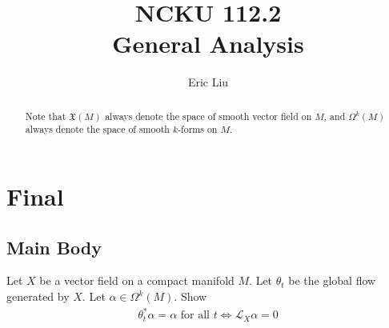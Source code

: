 \documentclass{report}
\title{\Huge{NCKU 112.2}\\
General Analysis}
\author{\huge{Eric Liu}}
\date{}
\begin{document}
\newpage%

\pagebreak
\chapter{Final} 
\section{Main Body}
\begin{abstract}
  Note that $\mathfrak{X}(M)$ always denote the space of smooth vector field on $M$, and $\Omega^k(M)$ always denote the space of smooth $k$-forms on  $M$. 
\end{abstract}
\begin{question}{}{}
Let $X$ be a vector field on a compact manifold $M$. Let  $\theta_t$ be the global flow generated by $X$. Let  $\alpha \in \Omega^k(M)$. Show 
\begin{align*}
\theta_t^* \alpha =\alpha \text{ for all }t \iff  \mathcal{L}_X \alpha =0
\end{align*}
\end{question}
\end{document}
